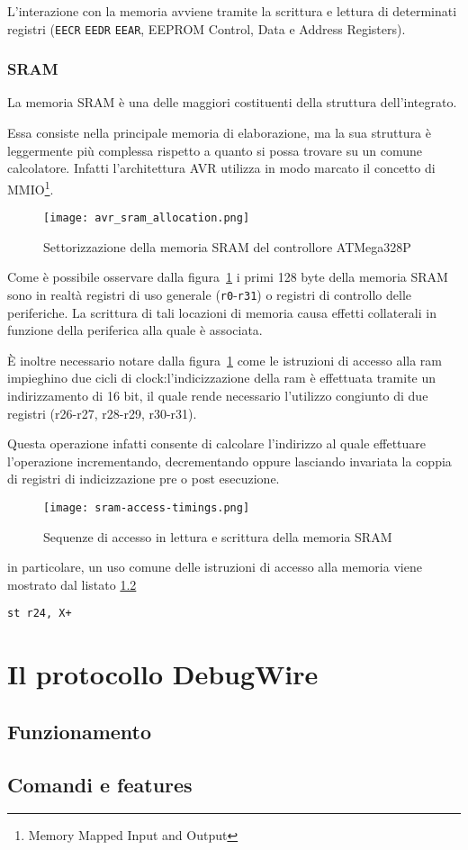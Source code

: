 L'interazione con la memoria avviene tramite la scrittura e lettura di determinati registri (\texttt{EECR} \texttt{EEDR} \texttt{EEAR}, EEPROM Control, Data e Address Registers)\cite{avr:m328p}.

\subsubsection{SRAM}
La memoria SRAM è una delle maggiori costituenti della struttura dell'integrato.

Essa consiste nella principale memoria di elaborazione, ma la sua struttura è leggermente più complessa rispetto a quanto si possa trovare su un comune calcolatore.
Infatti l'architettura AVR utilizza in modo marcato il concetto di MMIO\footnote{Memory Mapped Input and Output}.

\begin{figure}[b]
    \centering
    \texttt{[image: avr\_sram\_allocation.png]}
    \caption[Immagine ottenuta dal documento~\cite{avr:m328p}, fig. 8-3]{Settorizzazione della memoria SRAM del controllore ATMega328P\cite{avr:m328p}}\label{fig:avr-sram-alloc}
\end{figure}

Come è possibile osservare dalla figura~\ref{fig:avr-sram-alloc} i primi 128 byte della memoria SRAM sono in realtà registri di uso generale (\texttt{r0}-\texttt{r31}) o registri di controllo delle periferiche.
La scrittura di tali locazioni di memoria causa effetti collaterali in funzione della periferica alla quale è associata.

È inoltre necessario notare dalla figura~\ref{fig:avr-sram-alloc} come le istruzioni di accesso alla ram impieghino due cicli di clock:l'indicizzazione della ram è effettuata tramite un indirizzamento di 16 bit, il quale rende necessario l'utilizzo congiunto di due registri (r26-r27, r28-r29, r30-r31). 

Questa operazione infatti consente di calcolare l'indirizzo al quale effettuare l'operazione incrementando, decrementando oppure lasciando invariata la coppia di registri di indicizzazione pre o post esecuzione.

\begin{figure}[t]
    \centering
    \texttt{[image: sram-access-timings.png]}
    \caption[Immagine rielaborata a partire dalla fig. 8-4 del documento~\cite{avr:m328p}]{Sequenze di accesso in lettura e scrittura della memoria SRAM\cite{avr:m328p}}\label{fig:avr-sram-timings}
\end{figure}

in particolare, un uso comune delle istruzioni di accesso alla memoria viene mostrato dal listato \ref{}

\begin{lstlisting}[language=AVR, caption={Esempio}]
    st r24, X+
\end{lstlisting}

\section{Il protocollo DebugWire}
\subsection{Funzionamento}
\subsection{Comandi e features}